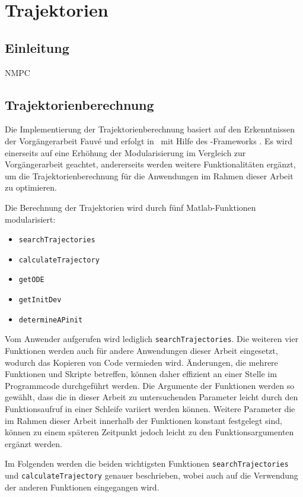 \chapter{Trajektorien}\label{cha:trj}

\section{Einleitung}
NMPC

\section{Trajektorienberechnung}

Die Implementierung der Trajektorienberechnung basiert auf den Erkenntnissen der Vorgängerarbeit Fauvé \cite{fauve} und erfolgt in \Matlab\ mit Hilfe des \casadi-Frameworks \cite{Andersson2019}. Es wird einerseits auf eine Erhöhung der Modularisierung im Vergleich zur Vorgängerarbeit geachtet, andererseits werden weitere Funktionalitäten ergänzt, um die Trajektorienberechnung für die Anwendungen im Rahmen dieser Arbeit zu optimieren.

Die Berechnung der Trajektorien wird durch fünf Matlab-Funktionen modularisiert:
\begin{itemize}
	\item \texttt{searchTrajectories}
	\item \texttt{calculateTrajectory}
	\item \texttt{getODE}
	\item \texttt{getInitDev}
	\item \texttt{determineAPinit}
\end{itemize}

Vom Anwender aufgerufen wird lediglich \texttt{searchTrajectories}. Die weiteren vier Funktionen werden auch für andere Anwendungen dieser Arbeit eingesetzt, wodurch das Kopieren von Code vermieden wird. Änderungen, die mehrere Funktionen und Skripte betreffen, können daher effizient an einer Stelle im Programmcode durchgeführt werden. Die Argumente der Funktionen werden so gewählt, dass die in dieser Arbeit zu untersuchenden Parameter leicht durch den Funktionsaufruf in einer Schleife variiert werden können. Weitere Parameter die im Rahmen dieser Arbeit innerhalb der Funktionen konstant festgelegt sind, können zu einem späteren Zeitpunkt jedoch leicht zu den Funktionsargumenten ergänzt werden.

Im Folgenden werden die beiden wichtigsten Funktionen \texttt{searchTrajectories} und \texttt{calculateTrajectory} genauer beschrieben, wobei auch auf die Verwendung der anderen Funktionen eingegangen wird.




